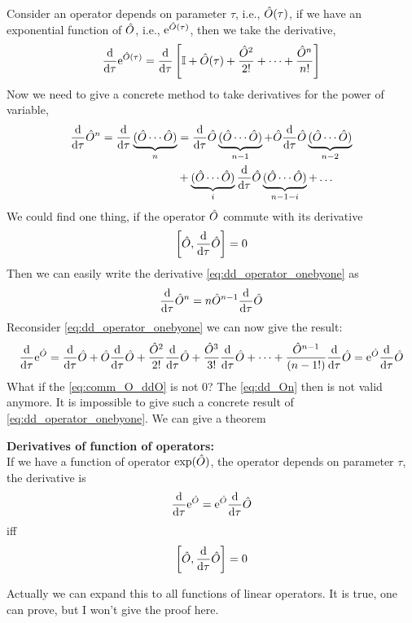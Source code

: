 Consider an operator depends on parameter $\tau$, i.e., $\hat{O}(\tau)$, if we have an exponential function of $\hat{O}$, i.e., $\mathrm{e}^{\hat{O}(\tau)}$, then we take the derivative, 
\begin{align}
    \frac{\mathrm{d}}{\mathrm{d} \tau} \mathrm{e}^{\hat{O}(\tau)} = \frac{\mathrm{d}}{\mathrm{d} \tau} \left[ \mathbb{I} + \hat{O}(\tau) + \frac{\hat{O}^2}{2!} + \dots + \frac{\hat{O}^n}{n!} \right] \label{eq:dd_exp}
\end{align}
Now we need to give a concrete method to take derivatives for the power of variable, 
\begin{align}
    \frac{\mathrm{d}}{\mathrm{d} \tau} \hat{O}^n = \frac{\mathrm{d}}{\mathrm{d} \tau} \underbrace{(\hat{O} \cdots \hat{O})}_{n} &= \frac{\mathrm{d}}{\mathrm{d} \tau} \hat{O} \underbrace{(\hat{O} \cdots \hat{O})}_{n-1} + \hat{O} \frac{\mathrm{d}}{\mathrm{d} \tau} \hat{O} \underbrace{(\hat{O} \cdots \hat{O})}_{n-2} \notag \\
    &+ \underbrace{(\hat{O} \cdots \hat{O})}_{i} \frac{\mathrm{d}}{\mathrm{d} \tau} \hat{O} \underbrace{(\hat{O} \cdots \hat{O})}_{n-1-i} + \dots \label{eq:dd_operator_onebyone}
\end{align} 
We could find one thing, if the operator $\hat{O}$ commute with its derivative
\begin{align}
    \left[ \hat{O} , \frac{\mathrm{d}}{\mathrm{d} \tau} \hat{O} \right] = 0 \label{eq:comm_O_ddO}
\end{align}
Then we can easily write the derivative \cref{eq:dd_operator_onebyone} as 
\begin{align}
    \frac{\mathrm{d}}{\mathrm{d} \tau} \hat{O}^n = n \hat{O}^{n-1} \frac{\mathrm{d}}{\mathrm{d} \tau} \hat{O} \label{eq:dd_On}
\end{align}
Reconsider \cref{eq:dd_operator_onebyone} we can now give the result: 
\begin{align}
    \frac{\mathrm{d}}{\mathrm{d} \tau} \mathrm{e}^{\hat{O}} =  \frac{\mathrm{d}}{\mathrm{d} \tau} \hat{O} + \hat{O} \frac{\mathrm{d}}{\mathrm{d} \tau} \hat{O} + \frac{\hat{O}^2}{2!} \frac{\mathrm{d}}{\mathrm{d} \tau} \hat{O} + \frac{\hat{O}^3}{3!}\frac{\mathrm{d}}{\mathrm{d} \tau} \hat{O} + \dots + \frac{\hat{O}^{n-1}}{(n-1!)}\frac{\mathrm{d}}{\mathrm{d} \tau} \hat{O} =\mathrm{e}^{\hat{O}} \frac{\mathrm{d}}{\mathrm{d} \tau} \hat{O} 
\end{align}
What if the \cref{eq:comm_O_ddO} is not 0? The \cref{eq:dd_On} then is not valid anymore. It is impossible to give such a concrete result of \cref{eq:dd_operator_onebyone}. We can give a theorem
\begin{theorem}{\textbf{Derivatives of function of operators:}}
    \\
    If we have a function of operator $\text{exp}(\hat{O})$, the operator depends on parameter $\tau$, the derivative is 
    \begin{eqnarray}
        \frac{\mathrm{d}}{\mathrm{d} \tau} \mathrm{e}^{\hat{O}} = \mathrm{e}^{\hat{O}} \frac{\mathrm{d}}{\mathrm{d} \tau} \hat{O} 
    \end{eqnarray}
    iff 
    \begin{eqnarray}
        \left[ \hat{O} , \frac{\mathrm{d}}{\mathrm{d} \tau} \hat{O} \right] = 0 
    \end{eqnarray}
\end{theorem}
Actually we can expand this to all functions of linear operators. It is true, one can prove, but I won't give the proof here.
\newpage
